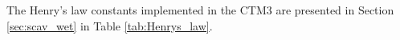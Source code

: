 The Henry's law constants implemented in the CTM3 are presented in Section \ref{sec:scav_wet} in Table \ref{tab:Henrys_law}. 

















